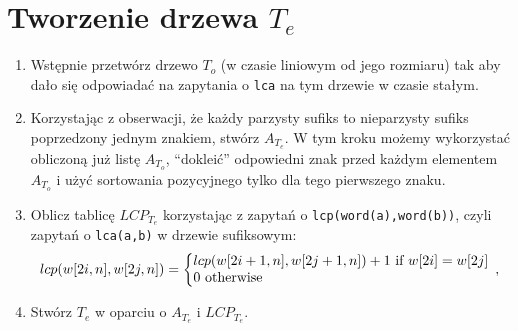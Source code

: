\documentclass[a4paper,oneside,10pt]{book}
\begin{document}
    \section*{Tworzenie drzewa $T_e$}
    \begin{enumerate}
     \item Wstępnie przetwórz drzewo $T_o$ (w czasie liniowym od jego rozmiaru) tak aby dało się odpowiadać na zapytania o \verb|lca| na tym drzewie w czasie stałym.
     \item Korzystając z obserwacji, że każdy parzysty sufiks to nieparzysty sufiks poprzedzony jednym znakiem, stwórz $A_{T_e}$. W tym kroku możemy wykorzystać obliczoną już listę $A_{T_o}$, ``dokleić'' odpowiedni znak przed każdym elementem $A_{T_o}$ i użyć sortowania pozycyjnego tylko dla tego pierwszego znaku.
     \item Oblicz tablicę $LCP_{T_e}$ korzystając z zapytań o \verb|lcp(word(a),word(b))|, czyli zapytań o \verb|lca(a,b)| w drzewie sufiksowym:
      \begin{align*}
      \left.
       lcp(w[2i,n],w[2j,n]) = \bigg\{
       \begin{array}{@{}l}
        lcp(w[2i+1,n],w[2j+1,n]) + 1 \text{ if } w[2i] = w[2j]   \\
        0 \text{ otherwise}
       \end{array},
        \right.              
      \end{align*}
      
      \item Stwórz $T_e$ w oparciu o $A_{T_e}$ i $LCP_{T_e}$.
    \end{enumerate}
    
\end{document}

